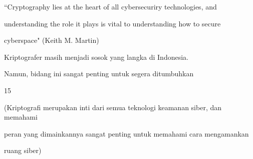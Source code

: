 \documentclass{article}
\begin{document}

“Cryptography lies at the heart of all cybersecuriry technologies, and 

understanding the role it plays is vital to understanding how to secure 

cyberspace" (Keith M. Martin)

Kriptografer masih menjadi sosok yang langka di Indonesia. 

Namun, bidang ini sangat penting untuk segera ditumbuhkan

15

(Kriptografi merupakan inti dari semua teknologi keamanan siber, dan memahami 

peran yang dimainkannya sangat penting untuk memahami cara mengamankan 

ruang siber)
\end{document}
